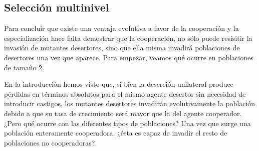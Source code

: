 \documentclass[a4paper,10pt]{article}
\begin{document}
\subsection{Selección multinivel}

Para concluir que existe una ventaja evolutiva a favor de la cooperación y la especialización hace falta demostrar que la cooperación, no sólo puede resisitir la invasión de mutantes desertores, sino que ella misma invadirá poblaciones de desertores una vez que aparece.
Para empezar, veamos qué ocurre en poblaciones de tamaño 2.

% 

En la introducción hemos visto que, si bien la deserción unilateral produce pérdidas en términos absolutos para el mismo agente desertor sin necesidad de introducir castigos, los mutantes desertores invadirán evolutivamente la población debido a que su tasa de crecimiento será mayor que la del agente cooperador.
¿Pero qué ocurre con las diferentes tipos de poblaciones?
Una vez que surge una población enteramente cooperadora, ¿ésta es capaz de invadir el resto de poblaciones no cooperadoras?.

\end{document}
